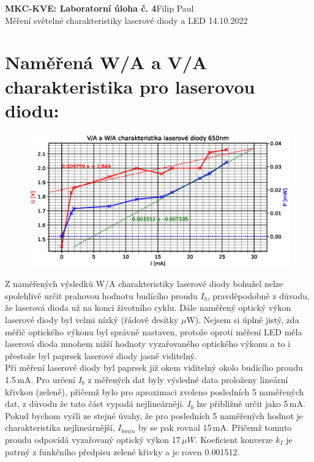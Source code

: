 \documentclass[10pt, a4paper]{article}%
\begin{document}
\begin{flushleft}%
	\textbf{\Large{MKC-KVE: Laboratorní úloha č. 4}}\hfill Filip Paul\\
	\large{Měření světelné charakteristiky laserové diody a LED \hfill 14.10.2022}
\end{flushleft}
	\section{\Large Naměřená W/A a V/A charakteristika pro laserovou diodu:}
	\begin{figure}[ht!]
		\centering
		\includegraphics[width = 1\textwidth]{Laser_650nm.eps}
	\end{figure}

	Z naměřených výsledků W/A charakteristiky laserové diody bohužel nelze spolehlivě určit prahovou hodnotu budícího proudu
	$I_{b}$, pravděpodobně z důvodu, že laserová dioda už na konci životního cyklu.
	Dále naměřený optický výkon laserové diody byl velmi nízký (řádově desítky $\mu$W).
	Nejsem si úplně jistý, zda měřič optického výkonu byl správně nastaven, protože
	oproti měření LED měla laserová dioda mnohem nižší hodnoty vyzařovaného optického výkonu
	a to i přestože byl paprsek laserové diody jasně viditelný.\\

	Při měření laserové diody byl paprsek již okem viditelný okolo budícího proudu 1.5\,mA.
	Pro určení $I_{b}$ z měřených dat byly výsledné data proloženy lineární křivkou (zeleně), přičemž bylo
	pro aproximaci zvoleno posledních 5 naměřených dat, z důvodu že tato část vypadá nejlineárněji.
	$I_{b}$ lze přibližně určit jako 5\,mA. Pokud bychom vyšli ze stejné úvahy, že pro posledních 5
	naměřených hodnot je charakteristika nejlineárnější, $I_{bmin}$ by se pak rovnal 15\,mA.
	Přičemž tomuto proudu odpovídá vyzařovaný optický výkon 17\,$\mu W$.
	Koeficient konverze $k_I$ je patrný z funkčního předpisu zelené křivky a je roven 0.001512.\\
	
\end{document}

